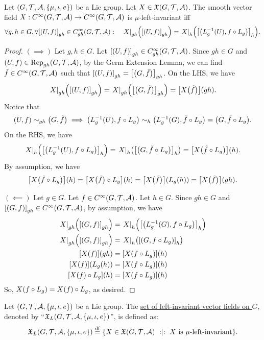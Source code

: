 \documentclass[11pt,reqno]{amsart}
\newcommand{\Rep}{\mathrm{Rep}}
\begin{document}
\begin{lemma}\label{lem:left-inv-char}
Let $(G,\T,\A,\set{\mu,\iota,e})$ be a Lie group.
Let $X\in\mathfrak{X}(G,\mathcal{T},\mathcal{A})$.
The smooth vector field $X:C^\infty(G,\mathcal{T},\mathcal{A})\to C^\infty(G,\mathcal{T},\mathcal{A})$
is $\mu$-left-invariant iff
\[
\forall g,h\in G,\forall\SqBr{(U,f)}_{gh}\in C_{gh}^\infty(G,\T,\A):\quad
\eval{X}_{gh}\Br{\SqBr{(U,f)}_{gh}}=\eval{X}_{h}\Br{\SqBr{\Br{L_g\inv(U),f\circ L_g}}_h}.
\]
\end{lemma}
\begin{proof}
$(\implies)$
Let $g,h\in G$.
Let $\SqBr{(U,f)}_{gh}\in C_{gh}^\infty(G,\T,\A)$.
Since $gh\in G$ and $(U,f)\in\Rep_{gh}(G,\T,\A)$,
by the Germ Extension Lemma, we can find
$\tilde f\in C^\infty(G,\mathcal{T},\mathcal{A})$ such that
$
\SqBr{(U,f)}_{gh}=\SqBr{\Br{G,\tilde f}}_{gh}
$.
On the LHS, we have
\[
\eval{X}_{gh}\Br{\SqBr{(U,f)}_{gh}}
=\eval{X}_{gh}\Br{\SqBr{\Br{G,\tilde f}}_{gh}}
=\FUNC{X\Br{\tilde f}}{gh}.
\]
Notice that
\[\Br{U,f}\sim_{gh}\Br{G,\tilde f}\implies
\Br{L_g\inv(U),f\circ L_g}\sim_h\Br{L_g\inv(G),\tilde f\circ L_g}
=\Br{G,\tilde f\circ L_g}.\]
On the RHS, we have
\[
\eval{X}_{h}\Br{\SqBr{\Br{L_g\inv(U),f\circ L_g}}_h}
=\eval{X}_{h}\Br{\SqBr{\Br{G,\tilde f\circ L_g}}_h}
=\FUNC{X\Br{\tilde f\circ L_g}}{h}.
\]
By assumption, we have
\[
\FUNC{X\Br{\tilde f\circ L_g}}{h}
=\FUNC{X\Br{\tilde f}\circ L_g}{h}
=\FUNC{X\Br{\tilde f}}{L_g(h)}
=\FUNC{X\Br{\tilde f}}{gh}.
\]

$(\impliedby)$
Let $g\in G$. Let $f\in C^\infty(G,\mathcal{T},\mathcal{A})$.
Let $h\in G$.
Since $gh\in G$ and $\SqBr{(G,f)}_{gh}\in C^\infty(G,\T,\A)$,
by assumption, we have
\[\begin{aligned}
\eval{X}_{gh}\Br{\SqBr{(G,f)}_{gh}}&=\eval{X}_{h}\Br{\SqBr{\Br{L_g\inv(G),f\circ L_g}}_h}\\
\eval{X}_{gh}\Br{\SqBr{(G,f)}_{gh}}&=\eval{X}_{h}\Br{\SqBr{\Br{G,f\circ L_g}}_h}\\
\FUNC{X(f)}{gh}&=\FUNC{X\Br{f\circ L_g}}{h}\\
\FUNC{X(f)}{L_g(h)}&=\FUNC{X\Br{f\circ L_g}}{h}\\
\FUNC{X(f)\circ L_g}{h}&=\FUNC{X\Br{f\circ L_g}}{h}\\
\end{aligned}\]
So, $X\Br{f\circ L_g}=X(f)\circ L_g$, as desired.
\end{proof}

\begin{Def}
Let $(G,\T,\A,\set{\mu,\iota,e})$ be a Lie group.
The \ul{set of left-invariant vector fields on $G$},
denoted by ``$\X_L(G,\T,\A,\set{\mu,\iota,e})$'', is defined as:
\[
\X_L(G,\T,\A,\set{\mu,\iota,e})
\df\set{X\in\X(G,\T,\A)\st X~\text{is $\mu$-left-invariant}}.
\]
\end{Def}
\end{document}
